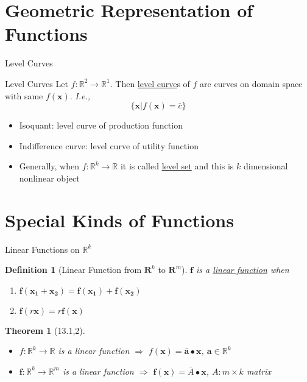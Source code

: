 \documentclass[a4paper,11pt]{article}
\newtheorem{defn}{Definition}
\newtheorem{thm}{Theorem}
\begin{document}
\section{Geometric Representation of Functions} %
\label{sec:geometric_representation_of_functions}
\begin{frame}[t]{Level Curves}
	\begin{block}
		{Level Curves}
		Let $f:\mathbb{R}^2\rightarrow\mathbb{R}^1$. Then \uline{level curve}s of $f$ are curves on domain space with same $f(\mathbf{x})$. \textit{I.e.,}
		\[
			\{\mathbf{x}\vert f(\mathbf{x})=\bar c\}
		\]
		\begin{itemize}
			\item Isoquant: level curve of production function
			\item Indifference curve: level curve of utility function
			\item Generally, when $f:\mathbb{R}^k\rightarrow\mathbb{R}$ it is called \uline{level set} and this is $k$ dimensional nonlinear object
		\end{itemize}
	\end{block}
\end{frame}

\section{Special Kinds of Functions} %
\label{sec:special_kinds_of_functions}
\begin{frame}[t]{Linear Functions on $\mathbb{R}^k$}
	\begin{defn}
		[Linear Function from $\mathbf{R}^k$ to $\mathbf{R}^m$]
		$\mathbf{f}$ is a \uline{linear function} when
		\begin{enumerate}
			\item $\mathbf{f}(\mathbf{x_1}+\mathbf{x_2})=\mathbf{f}(\mathbf{x_1})+\mathbf{f}(\mathbf{x_2})$
			\item $\mathbf{f}(r\mathbf{x})=r\mathbf{f(x)}$
		\end{enumerate}
	\end{defn}
	\begin{thm}
		[13.1,2] \begin{itemize}
			\item $f:\mathbb{R}^k\rightarrow\mathbb{R}$ is a linear function $\Rightarrow$ $f(\mathbf{x})=\bar{\mathbf{a}}\bullet\mathbf{x}$, $\mathbf{a}\in\mathbb{R}^k$
			\item $\mathbf{f}:\mathbb{R}^k\rightarrow\mathbb{R}^m$ is a linear function $\Rightarrow$ $\mathbf{f}(\mathbf{x})=\bar A\bullet\mathbf{x}$, $A:m\times k$ matrix
		\end{itemize}
		
	\end{thm}
\end{frame}
\end{document}
